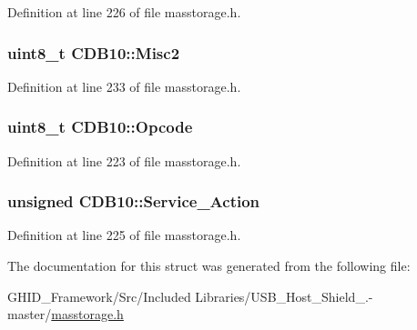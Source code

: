 \-Definition at line 226 of file masstorage.\-h.

\hypertarget{struct_c_d_b10_a26b2c33b7867c33d19e77c6d873d7924}{
\subsubsection[{\-Misc2}]{\setlength{\rightskip}{0pt plus 5cm}uint8\-\_\-t {\bf \-C\-D\-B10\-::\-Misc2}}}\label{struct_c_d_b10_a26b2c33b7867c33d19e77c6d873d7924}


\-Definition at line 233 of file masstorage.\-h.

\hypertarget{struct_c_d_b10_af18bbff0fec1a1d31c741c542f2e92d6}{
\subsubsection[{\-Opcode}]{\setlength{\rightskip}{0pt plus 5cm}uint8\-\_\-t {\bf \-C\-D\-B10\-::\-Opcode}}}\label{struct_c_d_b10_af18bbff0fec1a1d31c741c542f2e92d6}


\-Definition at line 223 of file masstorage.\-h.

\hypertarget{struct_c_d_b10_af1cd479d32aae0c581b735eb5aa081bc}{
\subsubsection[{\-Service\-\_\-\-Action}]{\setlength{\rightskip}{0pt plus 5cm}unsigned {\bf \-C\-D\-B10\-::\-Service\-\_\-\-Action}}}\label{struct_c_d_b10_af1cd479d32aae0c581b735eb5aa081bc}


\-Definition at line 225 of file masstorage.\-h.



\-The documentation for this struct was generated from the following file\-:\begin{DoxyCompactItemize}
\item 
\-G\-H\-I\-D\-\_\-\-Framework/\-Src/\-Included Libraries/\-U\-S\-B\-\_\-\-Host\-\_\-\-Shield\-\_.-\/master/\hyperlink{masstorage_8h}{masstorage.\-h}\end{DoxyCompactItemize}
